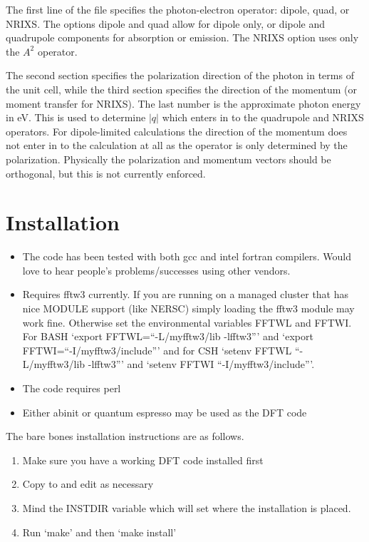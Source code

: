 \documentclass[11pt]{report}
\begin{document}
The first line of the  file specifies the photon-electron operator: dipole, quad, or NRIXS. The options dipole 
and quad allow for dipole only, or dipole and quadrupole components for absorption or emission. The NRIXS option uses only the $A^2$ 
operator. 

The second section specifies the polarization direction of the photon in terms of the unit cell, while the third section specifies the 
direction of the momentum (or moment transfer for NRIXS). The last number is the approximate photon energy in eV. This is used 
to determine $\vert q \vert$ which enters in to the quadrupole and NRIXS operators. For dipole-limited calculations the direction of the 
momentum does not enter in to the calculation at all as the operator is only determined by the polarization. 
Physically the polarization and momentum vectors should be orthogonal, but this is not currently enforced. 


\appendix
\chapter{Installation}
\begin{itemize}
\item The code has been tested with both gcc and intel fortran compilers. Would love to hear people's problems/successes using other vendors. 

\item Requires fftw3 currently. If you are running on a managed cluster that has nice MODULE support (like NERSC) simply loading the fftw3 module may work fine. Otherwise set the environmental variables FFTWL and FFTWI. For BASH `export FFTWL=``-L/myfftw3/lib -lfftw3''' and `export FFTWI=``-I/myfftw3/include''' and for CSH `setenv FFTWL ``-L/myfftw3/lib -lfftw3''' and `setenv FFTWI ``-I/myfftw3/include'''.
\item The code requires perl
\item Either {\sc abinit} or {\sc quantum espresso} may be used as the DFT code
\end{itemize}

The bare bones installation instructions are as follows.

\begin{enumerate}
\item{ Make sure you have a working DFT code installed first}
\item{ Copy  to  and edit as necessary}
\item{ Mind the INSTDIR variable which will set where the installation is placed. }
\item{ Run `make' and then `make install'}
\end{enumerate}
\end{document}
